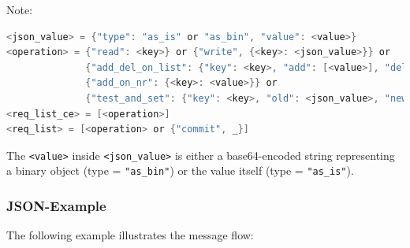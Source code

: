 \documentclass[a4paper]{scrreprt}
\newcommand{\code}[1]{\lstinline[basicstyle=\ttfamily]!#1!}
\begin{document}
Note:
\begin{lstlisting}[language=java]
<json_value> = {"type": "as_is" or "as_bin", "value": <value>}
<operation> = {"read": <key>} or {"write", {<key>: <json_value>}} or
              {"add_del_on_list": {"key": <key>, "add": [<value>], "del": [<value>]}} or
              {"add_on_nr": {<key>: <value>}} or
              {"test_and_set": {"key": <key>, "old": <json_value>, "new": <json_value>}}
<req_list_ce> = [<operation>]
<req_list> = [<operation> or {"commit", _}]
\end{lstlisting}
The \code{<value>} inside \code{<json_value>} is either a base64-encoded
string representing a binary object (type = \code{"as_bin"}) or the value
itself (type = \code{"as_is"}).

\subsubsection{JSON-Example}

The following example illustrates the message flow:
\end{document}
